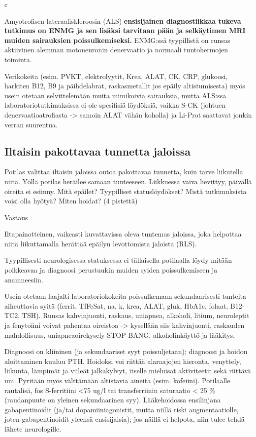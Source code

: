 \documentclass[
]{book}
\begin{document}
c

Amyotrofisen lateraaliskleroosin (ALS) \textbf{ensisijainen diagnostiikkaa tukeva tutkimus on ENMG ja sen lisäksi tarvitaan pään ja selkäytimen MRI muiden sairauksien poissulkemiseksi.} ENMG:ssä tyypillistä on runsas aktiivinen alemman motoneuronin denervaatio ja normaali tuntohermojen toiminta.

Verikokeita (esim. PVKT, elektrolyytit, Krea, ALAT, CK, CRP, glukoosi, harkiten B12, B9 ja päihdelabrat, raskasmetallit jos epäily altistumisesta) myös usein otetaan selvittelemään muita mimikoivia sairauksia, mutta ALS:ssa laboratoriotutkimuksissa ei ole spesifisiä löydöksiä, vaikka S-CK (johtuen denervaatioatrofiasta -\textgreater{} samoin ALAT vähän koholla) ja Li-Prot saattavat jonkin verran suurentua.

\subsection{Iltaisin pakottavaa tunnetta jaloissa}\label{iltaisin-pakottavaa-tunnetta-jaloissa}

Potilas valittaa iltaisin jaloissa outoa pakottavaa tunnetta, kuin tarve liikutella niitä. Yöllä potilas heräilee samaan tunteeseen. Liikkuessa vaiva lievittyy, päivällä oireita ei esiinny. Mitä epäilet? Tyypilliset statuslöydökset? Mistä tutkimuksista voisi olla hyötyä? Miten hoidat? (4 pistettä)

Vastaus

Iltapainotteinen, vaikeasti kuvattavissa oleva tuntemus jaloissa, joka helpottaa niitä liikuttamalla herättää epäilyn levottomista jaloista (RLS).

Tyypillisesti neurologisessa statuksessa ei tällaisella potilaalla löydy mitään poikkeavaa ja diagnoosi perustuukin muiden syiden poissulkemiseen ja anamneesiin.

Usein otetaan laajalti laboratoriokokeita poissulkemaan sekundaarisesti tunteita aiheuttavia syitä (ferrit, TfFeSat, na, k, krea, ALAT, gluk, HbA1c, folaat, B12-TC2, TSH). Runsas kahvinjuonti, raskaus, uniapnea, alkoholi, litium, neuroleptit ja fenytoiini voivat pahentaa oireistoa -\textgreater{} kysellään siis kahvinjuonti, raskauden mahdollisuus, uniapneaoirekysely STOP-BANG, alkoholinkäyttö ja lääkitys.

Diagnoosi on kliininen (ja sekundaariset syyt poissuljetaan); diagnoosi ja hoidon aloittaminen kuuluu PTH. Hoidoksi voi riittää alaraajojen hieronta, venyttely, liikunta, lämpimät ja viileät jalkakylvyt, itselle mieluisat aktiviteetit sekä riittävä uni. Pyritään myös välttämään altistavia aineita (esim. kofeiini). Potilaalle rautalisä, fos S-ferritiini \textless75 ug/l tai transferriinin saturaatio \textless{} 25 \% (raudanpuute on yleinen sekundaarinen syy). Lääkehoidossa ensilinjana gabapentinoidit (ja/tai dopamiiniagonistit, mutta niillä riski augmentaatiolle, joten gabapentinoidit yleensä ensisijaisia); jos näillä ei helpota, niin tulee tehdä lähete neurologille.
\end{document}
